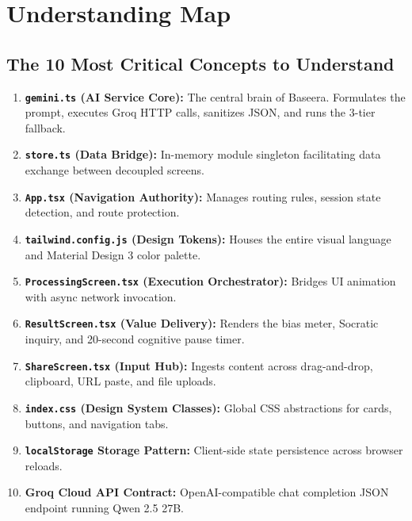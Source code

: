 \documentclass[10pt,a4paper]{report}
\begin{document}
\chapter{Understanding Map}

\section{The 10 Most Critical Concepts to Understand}
\begin{enumerate}[leftmargin=1.5em]
    \item \textbf{\texttt{gemini.ts} (AI Service Core):} The central brain of Baseera. Formulates the prompt, executes Groq HTTP calls, sanitizes JSON, and runs the 3-tier fallback.
    \item \textbf{\texttt{store.ts} (Data Bridge):} In-memory module singleton facilitating data exchange between decoupled screens.
    \item \textbf{\texttt{App.tsx} (Navigation Authority):} Manages routing rules, session state detection, and route protection.
    \item \textbf{\texttt{tailwind.config.js} (Design Tokens):} Houses the entire visual language and Material Design 3 color palette.
    \item \textbf{\texttt{ProcessingScreen.tsx} (Execution Orchestrator):} Bridges UI animation with async network invocation.
    \item \textbf{\texttt{ResultScreen.tsx} (Value Delivery):} Renders the bias meter, Socratic inquiry, and 20-second cognitive pause timer.
    \item \textbf{\texttt{ShareScreen.tsx} (Input Hub):} Ingests content across drag-and-drop, clipboard, URL paste, and file uploads.
    \item \textbf{\texttt{index.css} (Design System Classes):} Global CSS abstractions for cards, buttons, and navigation tabs.
    \item \textbf{\texttt{localStorage} Storage Pattern:} Client-side state persistence across browser reloads.
    \item \textbf{Groq Cloud API Contract:} OpenAI-compatible chat completion JSON endpoint running Qwen 2.5 27B.
\end{enumerate}
\end{document}
